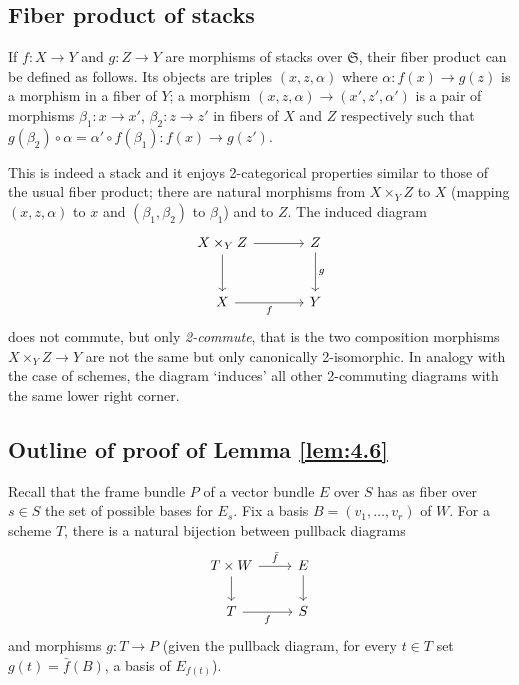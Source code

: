 \documentclass[12pt]{memoir}
\begin{document}
\subsection{Fiber product of stacks}

\begin{Def}\label{def:6.1}
If $f\colon X \to Y$ and $g\colon Z \to Y$ are morphisms of stacks over $\mathfrak{S}$, their fiber product can be defined as follows. Its objects are triples $(x, z, \alpha)$ where $\alpha\colon f(x) \to g(z)$ is a morphism in a fiber of $Y$; a morphism $(x, z, \alpha) \to (x', z', \alpha')$ is a pair of morphisms $\beta_1\colon x \to x'$, $\beta_2\colon z \to z'$ in fibers of $X$ and $Z$ respectively such that $g(\beta_2) \circ \alpha = \alpha' \circ f(\beta_1)\colon f(x) \to g(z')$.
\end{Def}


This is indeed a stack and it enjoys 2-categorical properties similar to those of the usual fiber product; there are natural morphisms from $X \times_Y Z$ to $X$ (mapping $(x, z, \alpha)$ to $x$ and $(\beta_1, \beta_2)$ to $\beta_1$) and to $Z$. The induced diagram
$$
\begin{tikzcd}[row sep=large, column sep=large]
X \times_Y Z \arrow[r] \arrow[d] & Z \arrow[d, "g"] \\
X \arrow[r, "f"'] & Y
\end{tikzcd}
$$
does not commute, but only \emph{2-commute}, that is the two composition morphisms $X \times_Y Z \to Y$ are not the same but only canonically 2-isomorphic. In analogy with the case of schemes, the diagram `induces' all other 2-commuting diagrams with the same lower right corner.

\subsection{Outline of proof of Lemma \ref{lem:4.6}}
\label{sec:proof-frame-bundle}

Recall that the frame bundle $P$ of a vector bundle $E$ over $S$ has as fiber over $s \in S$ the set of possible bases for $E_s$. Fix a basis $B = (v_1, \dots, v_r)$ of $W$. For a scheme $T$, there is a natural bijection between pullback diagrams
$$
\begin{tikzcd}
T \times W \arrow[r, "\bar{f}"] \arrow[d] & E \arrow[d] \\
T \arrow[r, "f"'] & S
\end{tikzcd}
$$
and morphisms $g\colon T \to P$ (given the pullback diagram, for every $t \in T$ set $g(t) = \bar{f}(B)$, a basis of $E_{f(t)}$).
\end{document}
